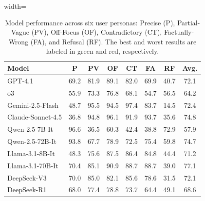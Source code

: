 \documentclass[sigconf]{acmart}
\begin{document}





\begin{table}[!t]
\centering
\caption{Model performance across six user personas: Precise (P), Partial-Vague (PV), Off-Focus (OF), Contradictory (CT), Factually-Wrong (FA), and Refusal (RF).
The best and worst results are labeled in green and red, respectively.
}
\label{tab:perf_user_type}
\begin{adjustbox}{width=\linewidth}
\begin{tabular}{lccccccc}
\toprule
\textbf{Model} & \textbf{P } & \textbf{PV } & \textbf{OF } & \textbf{CT } & \textbf{FA } & \textbf{RF } & \textbf{Avg. } \\
\midrule

GPT-4.1 
& 69.2 
& 81.9 
& 89.1 
& 82.0 
& 69.9 
& 40.7 
& 72.1 \\

o3  
& 55.9 
& 73.3 
& 76.8 
& 68.1 
& 54.7 
& 56.5 
& 64.2 \\

Gemini-2.5-Flash 
& 48.7 
& \cellcolor{green!20}95.5 
& 94.5 
& \cellcolor{green!20}97.4 
& 83.7 
& \cellcolor{red!20}14.5 
& 72.4 \\

Claude-Sonnet-4.5 
& \cellcolor{red!20}36.8 
& 94.8 
& \cellcolor{green!20}96.1 
& 91.9 
& \cellcolor{green!20}93.7 
& 35.6 
& 74.8 \\

Qwen-2.5-7B-It 
& \cellcolor{green!20}96.6 
& \cellcolor{red!20}36.5 
& \cellcolor{red!20}60.3 
& \cellcolor{red!20}42.4 
& \cellcolor{red!20}38.8 
& \cellcolor{green!20}72.9 
& \cellcolor{red!20}57.9 \\

Qwen-2.5-72B-It 
& 93.8 
& 67.7 
& 78.9 
& 72.5 
& 75.4 
& 59.8 
& 74.7 \\

Llama-3.1-8B-It 
& 48.3 
& 75.6 
& 87.5 
& 86.4 
& 84.8 
& 44.4 
& 71.2 \\

Llama-3.1-70B-It 
& 70.4 
& 85.1 
& 90.9 
& 88.7 
& 88.7 
& 39.0 
& \cellcolor{green!20}77.1 \\

DeepSeek-V3 
& 70.0 
& 85.0 
& 82.1 
& 85.6 
& 78.6 
& 31.5 
& 72.1 \\

DeepSeek-R1 
& 68.0 
& 77.4 
& 78.8 
& 73.7 
& 64.4 
& 49.1 
& 68.6 \\

\bottomrule
\end{tabular}
\end{adjustbox}
\vspace{-0.1in}
\end{table}
\end{document}
